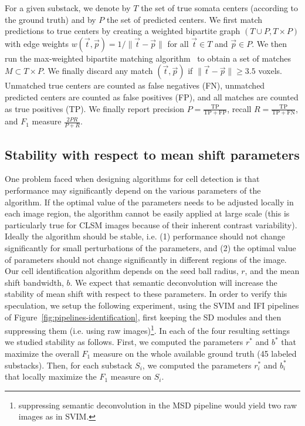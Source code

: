 \documentclass[smallextended]{svjour3}       %
\begin{document}
For a given substack, we denote by $T$ the set of true somata centers
(according to the ground truth) and by $P$ the set of predicted
centers. We first match predictions to true centers by creating a
weighted bipartite graph $(T\cup P, T\times P)$ with edge weights
$w(\vec{t},\vec{p}) = 1/\|\vec{t}-\vec{p}\|$ for all $\vec{t}\in T$ and $\vec{p}\in P$. We
then run the max-weighted bipartite matching
algorithm~\cite{galil_efficient_1986} to obtain a set of matches
$M\subset T\times P$. We finally discard any match $(\vec{t},\vec{p})$ if
$\|\vec{t}-\vec{p}\|\geq 3.5$ voxels.
Unmatched true centers are counted as false negatives (FN), unmatched
predicted centers are counted as false positives (FP), and all matches
are counted as true positives (TP). We finally report precision
$P=\frac{\mathrm{TP}}{\mathrm{TP}+\mathrm{FP}}$, recall
$R=\frac{\mathrm{TP}}{\mathrm{TP}+\mathrm{FN}}$, and $F_1$ measure
$\frac{2PR}{P+R}$.


\subsection{Stability with respect to mean shift parameters}
\label{sec:stability}
One problem faced when designing algorithms for cell detection is that
performance may significantly depend on the various parameters of the
algorithm. If the optimal value of the parameters needs to be adjusted
locally in each image region, the algorithm cannot be easily applied at
large scale (this is particularly true for CLSM images because of
their inherent contrast variability). Ideally the algorithm should be
stable, i.e. (1) performance should not change significantly for small
perturbations of the parameters, and (2) the optimal value of
parameters should not change significantly in different regions of the
image.  Our cell identification algorithm depends on the seed ball
radius, $r$, and the mean shift bandwidth, $b$. We expect that
semantic deconvolution will increase the stability of mean shift with
respect to these parameters. In order to verify this speculation, we
setup the following experiment, using the SVIM and IFI pipelines of
Figure~\ref{fig:pipelines-identification}, first keeping the SD
modules and then suppressing them (i.e. using raw
images)\footnote{suppressing semantic deconvolution in the MSD
  pipeline would yield two raw images as in SVIM.}. In each of the four resulting
settings we studied stability as follows.  First, we computed the
parameters $r^*$ and $b^*$ that maximize the overall $F_1$ measure on
the whole available ground truth (45 labeled substacks). Then, for
each substack $S_i$, we computed the parameters $r^*_i$ and $b^*_i$
that locally maximize the $F_1$ measure on $S_i$.
\end{document}
